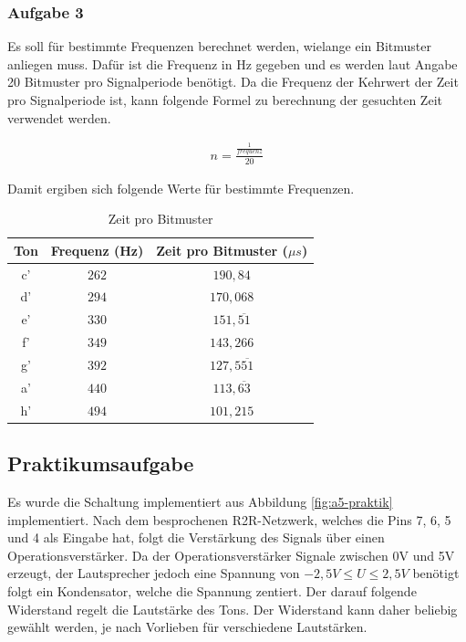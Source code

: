 \newpage

\subsubsection{Aufgabe 3}

Es soll für bestimmte Frequenzen berechnet werden, wielange ein Bitmuster anliegen muss.
Dafür ist die Frequenz in Hz gegeben und es werden laut Angabe 20 Bitmuster pro Signalperiode benötigt.
Da die Frequenz der Kehrwert der Zeit pro Signalperiode ist, kann folgende Formel zu berechnung der gesuchten Zeit verwendet werden.

\begin{align}
    n = \frac{\frac{1}{frequenz}}{20}
\end{align}

Damit ergiben sich folgende Werte für bestimmte Frequenzen.

\begin{table}[h]
    \centering
    \caption{Zeit pro Bitmuster}
    \label{tab:zeit-pro-bitmuster}
    \begin{tabular}{| c | c | c |}
        \hline
        Ton & Frequenz (Hz) & Zeit pro Bitmuster ($\mu s$) \\
        \hline
        c' & $262$ & $190,84$ \\
        d' & $294$ & $170,068$ \\
        e' & $330$ & $151,\overline{51}$ \\
        f' & $349$ & $143,266$ \\
        g' & $392$ & $127,5\overline{51}$ \\
        a' & $440$ & $113,\overline{63}$ \\
        h' & $494$ & $101,215$ \\
        \hline
    \end{tabular}
\end{table}

\subsection{Praktikumsaufgabe}
\label{subsec:a5-praktikumsaufgabe}

Es wurde die Schaltung implementiert aus Abbildung \ref{fig:a5-praktik} implementiert.
Nach dem besprochenen R2R-Netzwerk, welches die Pins 7, 6, 5 und 4 als Eingabe hat, folgt die Verstärkung des Signals über einen Operationsverstärker.
Da der Operationsverstärker Signale zwischen 0V und 5V erzeugt, der Lautsprecher jedoch eine Spannung von $-2,5V \leq U \leq 2,5V$ benötigt folgt ein Kondensator, welche die Spannung zentiert.
Der darauf folgende Widerstand regelt die Lautstärke des Tons.
Der Widerstand kann daher beliebig gewählt werden, je nach Vorlieben für verschiedene Lautstärken.

